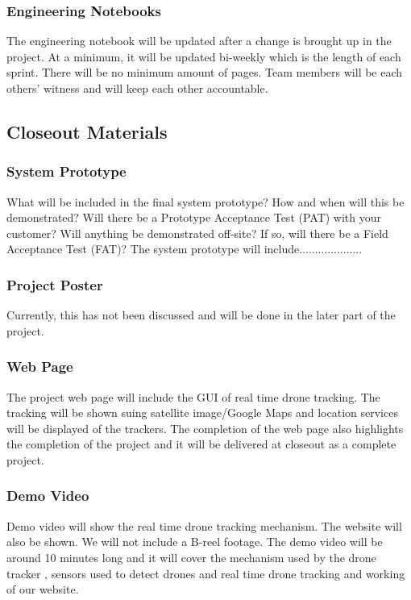 \subsubsection{Engineering Notebooks}
The engineering notebook will be updated after a change is brought up in the project. At a minimum, it will be updated bi-weekly which is the length of each sprint. There will be no minimum amount of pages. Team members will be each others' witness and will keep each other accountable.

\subsection{Closeout Materials}
\subsubsection{System Prototype}
What will be included in the final system prototype? How and when will this be demonstrated? Will there be a Prototype Acceptance Test (PAT) with your customer? Will anything be demonstrated off-site? If so, will there be a Field Acceptance Test (FAT)?
The system prototype will include....................

\subsubsection{Project Poster}
Currently, this has not been discussed and will be done in the later part of the project.

\subsubsection{Web Page}
The project web page will include the GUI of real time drone tracking. The tracking will be shown suing satellite image/Google Maps and location services will be displayed of the trackers. The completion of the web page also highlights the completion of the project and it will be delivered at closeout as a complete project.

\subsubsection{Demo Video}
Demo video will show the real time drone tracking mechanism. The website will also be shown. We will not include a B-reel footage. The demo video will be around 10 minutes long and it will cover the mechanism used by the drone tracker , sensors used to detect drones and real time drone tracking and working of our website.

